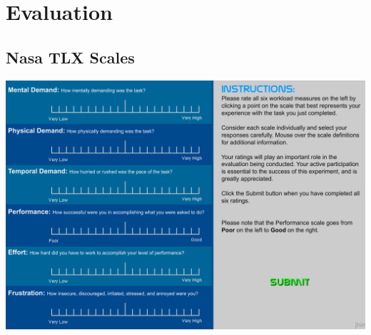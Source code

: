 \chapter{Evaluation}

\section{Nasa TLX Scales}
\label{sec:appendixnasatlx}

\includegraphics[width=\textwidth]{Figures/appendix_nasatlx.png}



